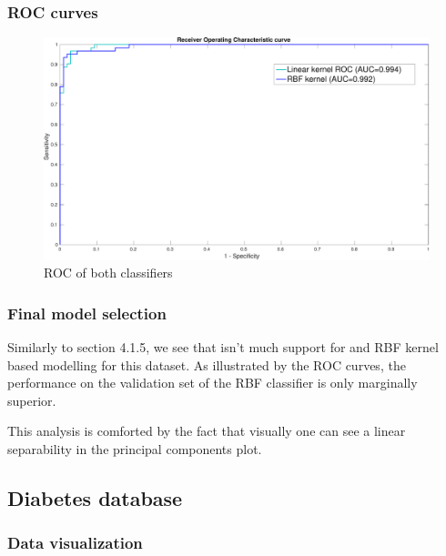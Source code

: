 \documentclass[11pt, a4paper]{article}
\begin{document}
\subsubsection{ROC curves}

\begin{figure}[H]
    \centering
    \includegraphics[scale=.40]{breast_ROC.pdf}
    \caption{ROC of both classifiers}
    \label{fig:breast_ROC}
\end{figure}

\subsubsection{Final model selection}

Similarly to section 4.1.5, we see that isn't much support for and RBF
kernel based modelling for this dataset. As illustrated by the ROC
curves, the performance on the validation set of the RBF classifier is
only marginally superior.

This analysis is comforted by the fact that visually one can see a
linear separability in the principal components plot.

\subsection{Diabetes database}

\subsubsection{Data visualization}
\end{document}
